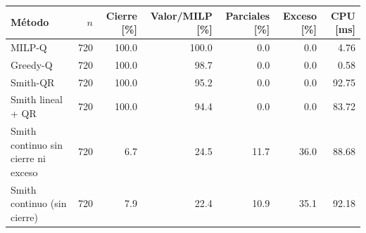 \begin{tabular}{lrrrrrr}
\toprule
Método & $n$ & Cierre [\%] & Valor/MILP [\%] & Parciales [\%] & Exceso [\%] & CPU [ms] \\
\midrule
MILP-Q & 720 & 100.0 & 100.0 & 0.0 & 0.0 & 4.76 \\
Greedy-Q & 720 & 100.0 & 98.7 & 0.0 & 0.0 & 0.58 \\
Smith-QR & 720 & 100.0 & 95.2 & 0.0 & 0.0 & 92.75 \\
Smith lineal + QR & 720 & 100.0 & 94.4 & 0.0 & 0.0 & 83.72 \\
Smith continuo sin cierre ni exceso & 720 & 6.7 & 24.5 & 11.7 & 36.0 & 88.68 \\
Smith continuo (sin cierre) & 720 & 7.9 & 22.4 & 10.9 & 35.1 & 92.18 \\
\bottomrule
\end{tabular}
